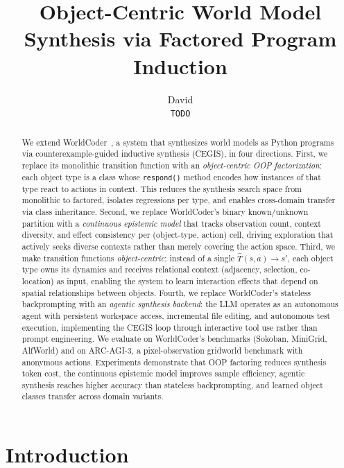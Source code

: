 \documentclass{article}
\title{Object-Centric World Model Synthesis via Factored Program Induction}
\author{
  David \\
  \texttt{TODO} \\
}
\begin{document}
\maketitle

\begin{abstract}
We extend WorldCoder~\cite{tang2024worldcoder}, a system that synthesizes
world models as Python programs via counterexample-guided inductive synthesis
(CEGIS), in four directions.  First, we replace its monolithic transition
function with an \emph{object-centric OOP factorization}: each object type is
a class whose \texttt{respond()} method encodes how instances of that type
react to actions in context.  This reduces the synthesis search space from
monolithic to factored, isolates regressions per type, and enables cross-domain
transfer via class inheritance.  Second, we replace WorldCoder's binary
known/unknown partition with a \emph{continuous epistemic model} that tracks
observation count, context diversity, and effect consistency per
(object-type, action) cell, driving exploration that actively seeks diverse
contexts rather than merely covering the action space.  Third, we make
transition functions \emph{object-centric}: instead of a single
$\hat{T}(s,a) \to s'$, each object type owns its dynamics and receives
relational context (adjacency, selection, co-location) as input, enabling the
system to learn interaction effects that depend on spatial relationships between
objects.  Fourth, we replace WorldCoder's stateless backprompting with an
\emph{agentic synthesis backend}: the LLM operates as an autonomous agent with
persistent workspace access, incremental file editing, and autonomous test
execution, implementing the CEGIS loop through interactive tool use rather
than prompt engineering.  We evaluate on WorldCoder's benchmarks (Sokoban,
MiniGrid, AlfWorld) and on ARC-AGI-3, a pixel-observation gridworld benchmark
with anonymous actions.  Experiments demonstrate that OOP factoring reduces
synthesis token cost, the continuous epistemic model improves sample efficiency,
agentic synthesis reaches higher accuracy than stateless backprompting, and
learned object classes transfer across domain variants.
\end{abstract}



\section{Introduction}
\label{sec:intro}
\end{document}
